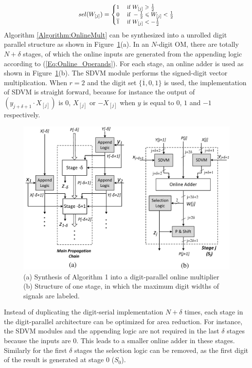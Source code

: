 \documentclass{acm_proc_article-sp}
\begin{document}
\vspace{-2ex}
\begin{eqnarray}\label{Eq:SelFunc_OM}
\small
  sel(W_{[j]})=\begin{cases}
    1 & \text{ if } W_{[j]} \geqslant \frac{1}{2} \\
    0 & \text{ if } -\frac{1}{2}\leqslant W_{[j]}<\frac{1}{2} \\
    \overline{1} & \text{ if } W_{[j]}<-\frac{1}{2}
  \end{cases}
\normalsize
\end{eqnarray}
%
Algorithm \ref{Algorithm:OnlineMult} can be synthesized into a unrolled digit parallel structure as shown in  Figure~\ref{Fig:Radix2OnlineMultiplier}(a). In an $N$-digit OM, there are totally $N+\delta$ stages, of which the online inputs are generated from the appending logic according to (\ref{Eq:Online_Operands}). For each stage, an online adder is used as shown in Figure~\ref{Fig:Radix2OnlineMultiplier}(b). The SDVM module performs the signed-digit vector multiplication. When $r=2$ and the digit set $\{\overline{1},0,1\}$ is used, the implementation of SDVM is straight forward, because for instance the output of $(y_{j+\delta+1}\cdot X_{[j]})$ is 0, $X_{[j]}$ or $-X_{[j]}$ when $y$ is equal to $0$, $1$ and $-1$ respectively.\vspace{-1ex}

\begin{figure}[tbp]
\centering
\includegraphics[width=.49\textwidth]{./Figures/OnlineMult_Unrolled.pdf}
\vspace{-4ex}
\caption{(a) Synthesis of Algorithm 1 into a digit-parallel online multiplier (b) Structure of one stage, in which the maximum digit widths of signals are labeled.}
\vspace{-2ex}
\label{Fig:Radix2OnlineMultiplier}
\end{figure}

Instead of duplicating the digit-serial implementation $N+\delta$ times, each stage in the digit-parallel architecture can be optimized for area reduction. For instance, the SDVM modules and the appending logic are not required in the last $\delta$ stages because the inputs are 0. This leads to a smaller online adder in these stages. Similarly for the first $\delta$ stages the selection logic can be removed, as the first digit of the result is generated at stage 0 ($S_0$).
\end{document}
